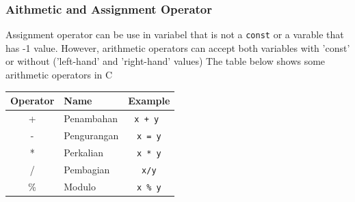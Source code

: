 \subsubsection{Aithmetic and Assignment Operator }
Assignment operator can be use in variabel that is not a \verb*|const| or a varable that has -1 value. However, arithmetic operators can accept both variables with 'const' or without ('left-hand' and 'right-hand' values)
The table below shows some arithmetic operators in C
\begin{center}
	\begin{tabular}{|c|l|c|}
		\hline
		\multicolumn{1}{|l|}{Operator} & Name & \multicolumn{1}{l|}{Example} \\ \hline
		+  & Penambahan &\verb|x + y |  \\ \hline
		-  & Pengurangan &\verb|x = y|   \\ \hline
		*  & Perkalian   & \verb|x * y|  \\ \hline
		/  & Pembagian   & \verb|x/y|  \\ \hline
		\% & Modulo     & \verb|x % y| \\ \hline
	\end{tabular}
\end{center}

